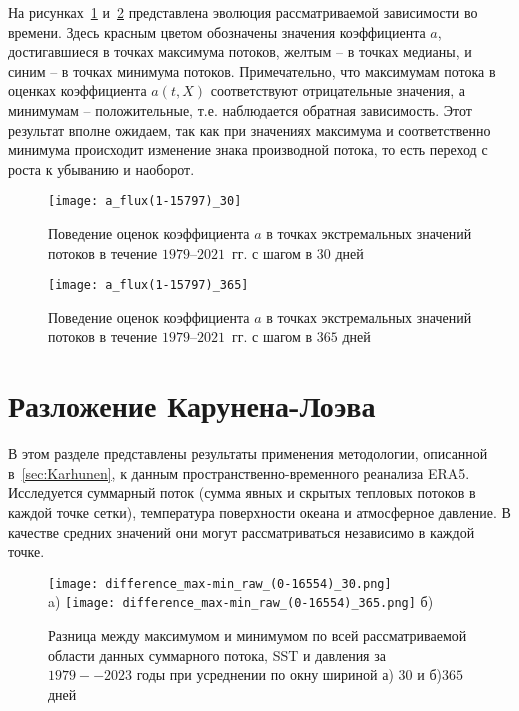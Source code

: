 На рисунках~\ref{fig:a_flux_month} и~\ref{fig:a_flux_year} представлена эволюция рассматриваемой зависимости во времени. Здесь красным цветом обозначены значения коэффициента $a$, достигавшиеся в точках максимума потоков, желтым -- в точках медианы, и синим -- в точках минимума потоков. Примечательно, что максимумам потока в оценках коэффициента $a(t,X)$ соответствуют отрицательные значения, а минимумам -- положительные, т.е. наблюдается обратная зависимость. Этот результат вполне ожидаем, так как при значениях максимума и соответственно минимума происходит изменение знака производной потока, то есть переход с роста к убыванию и наоборот.

\begin{figure}[!h]
	\centering
	\texttt{[image: a\_flux(1-15797)\_30]}
	\caption{Поведение оценок коэффициента $a$ в точках экстремальных значений потоков в течение $1979$--$2021$~гг. с шагом в $30$ дней}
	\label{fig:a_flux_month}
\end{figure}

\begin{figure}[!h]
	\centering
	\texttt{[image: a\_flux(1-15797)\_365]}
	\caption{Поведение оценок коэффициента $a$ в точках экстремальных значений потоков в течение $1979$--$2021$~гг. с шагом в $365$ дней}\label{fig:a_flux_year}
\end{figure}

\section{Разложение Карунена-Лоэва}
\label{sec:analysis}
В этом разделе представлены результаты применения методологии, описанной в~\ref{sec:Karhunen}, к данным пространственно-временного реанализа ERA5. Исследуется суммарный поток (сумма явных и скрытых тепловых потоков в каждой точке сетки), температура поверхности океана и атмосферное давление. В качестве средних значений они могут рассматриваться независимо в каждой точке.

\begin{figure}
	\centering
	\texttt{[image: difference\_max-min\_raw\_(0-16554)\_30.png]}\\
	a)
	\texttt{[image: difference\_max-min\_raw\_(0-16554)\_365.png]}
	б)
	\caption{Разница между максимумом и минимумом по всей рассматриваемой области данных суммарного потока, SST и давления за $1979--2023$ годы при усреднении по окну шириной а) $30$ и б)$365$ дней}
	\label{fig:raw_trends}
\end{figure}

